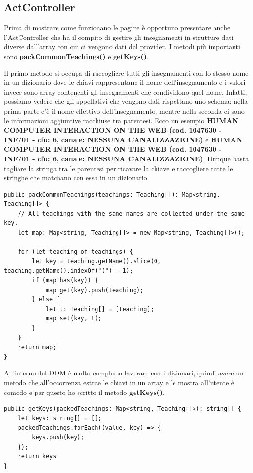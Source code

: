 \documentclass[Lau, oneside, noexaminfo]{sapthesis}%
\begin{document}
\subsection{ActController}
\label{sc:controller}
Prima di mostrare come funzionano le pagine è opportuno presentare anche l'ActController che ha il compito di gestire gli insegnamenti in strutture dati diverse dall'array con cui ci vengono dati dal provider. I metodi più importanti sono \textbf{packCommonTeachings()} e \textbf{getKeys()}.

Il primo metodo si occupa di raccogliere tutti gli insegnamenti con lo stesso nome in un dizionario dove le chiavi rappresentano il nome dell'insegnamento e i valori invece sono array contenenti gli insegnamenti che condividono quel nome. Infatti, possiamo vedere che gli appellativi che vengono dati rispettano uno schema: nella prima parte c'è il nome effettivo dell'insegnamento, mentre nella seconda ci sono le informazioni aggiuntive racchiuse tra parentesi. Ecco un esempio \textbf{HUMAN COMPUTER INTERACTION ON THE WEB (cod. 1047630 - INF/01 - cfu: 6, canale: NESSUNA CANALIZZAZIONE)} e \textbf{HUMAN COMPUTER INTERACTION ON THE WEB (cod. 1047630 - INF/01 - cfu: 6, canale: NESSUNA CANALIZZAZIONE)}. Dunque basta tagliare la stringa tra le parentesi per ricavare la chiave e raccogliere tutte le stringhe che matchano con essa in un dizionario.

\begin{lstlisting}[frame=single]
public packCommonTeachings(teachings: Teaching[]): Map<string, Teaching[]> {
	// All teachings with the same names are collected under the same key.
	let map: Map<string, Teaching[]> = new Map<string, Teaching[]>();

	for (let teaching of teachings) {
		let key = teaching.getName().slice(0, teaching.getName().indexOf("(") - 1);
		if (map.has(key)) {
			map.get(key).push(teaching);
		} else {
			let t: Teaching[] = [teaching];
			map.set(key, t);
		}
	}
	return map;
}
\end{lstlisting}

All'interno del DOM è molto complesso lavorare con i dizionari, quindi avere un metodo che all'occorrenza estrae le chiavi in un array e le mostra all'utente è comodo e per questo ho scritto il metodo \textbf{getKeys()}.

\begin{lstlisting}[frame=single]
public getKeys(packedTeachings: Map<string, Teaching[]>): string[] {
	let keys: string[] = [];
	packedTeachings.forEach((value, key) => {
		keys.push(key);
	});
	return keys;
}
\end{lstlisting}
\end{document}
